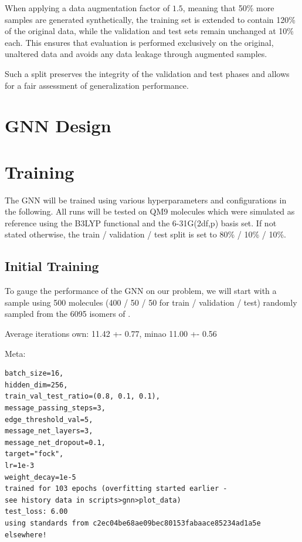 When applying a data augmentation factor of $1.5$, meaning that 50\% more samples are generated synthetically, the training set is extended to contain 120\% of the original data, while the validation and test sets remain unchanged at 10\% each. This ensures that evaluation is performed exclusively on the original, unaltered data and avoids any data leakage through augmented samples.

Such a split preserves the integrity of the validation and test phases and allows for a fair assessment of generalization performance.

\section{GNN Design}
\label{sec:gnn_design}


\section{Training}
\label{sec:gnn_training}

The GNN will be trained using various hyperparameters and configurations in the following. All runs will be tested on QM9  molecules which were simulated as reference using the B3LYP functional and the 6-31G(2df,p) basis set. If not stated otherwise, the train / validation / test split is set to 80\% / 10\% / 10\%.\\

\subsection{Initial Training}
\label{subsec:gnn_initial_training}
To gauge the performance of the GNN on our problem, we will start with a sample using 500 molecules (400 / 50 / 50 for train / validation / test) randomly sampled from the 6095 isomers of . 

Average iterations own: 11.42 +- 0.77, minao 11.00 +- 0.56

\TODO{}

Meta: 
\begin{verbatim}
batch_size=16,
hidden_dim=256,
train_val_test_ratio=(0.8, 0.1, 0.1),
message_passing_steps=3,
edge_threshold_val=5,
message_net_layers=3,
message_net_dropout=0.1,
target="fock",
lr=1e-3 
weight_decay=1e-5
trained for 103 epochs (overfitting started earlier - 
see history data in scripts>gnn>plot_data)
test_loss: 6.00
using standards from c2ec04be68ae09bec80153fabaace85234ad1a5e elsewhere!
\end{verbatim}
        
